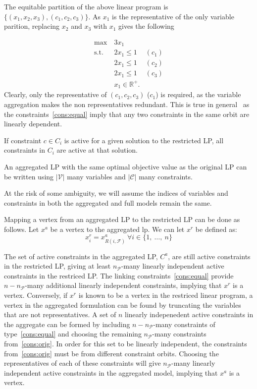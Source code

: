 \documentclass[runningheads]{llncs}
\newcommand{\cP}{{\mathcal P}}
\newcommand{\cF}{{\mathcal F}}
\newcommand{\cC}{{\mathcal C}}
\newcommand{\cV}{{\mathcal V}}
\begin{document}
\noindent The equitable partition of the above linear program is $\{(x_1, x_2, x_3), (c_1, c_2, c_3)\}$. As $x_1$ is the representative of the only variable parition, replacing $x_2$ and $x_3$ with $x_1$ gives the following 

\begin{align}
\max\ & 3x_1 \\
\mbox{s.t. } & 2x_1  \leq 1 & (c_1)\\
& 2x_1 \leq 1 & (c_2)\\
& 2x_1  \leq 1 & (c_3)\\
& x_1 \in \mathbb{R}^+.
\end{align}
\noindent Clearly, only the representative of $(c_1, c_2, c_3)$  ($c_1$) is required, as the variable aggregation makes the non representatives redundant. This is true in general~\cite{grohe} as the constraints~\eqref{cons:equal} imply that any two constraints in the same orbit are linearly dependent.


\begin{corollary} \label{cor:cons_equal}
	If constraint $c \in C_i$ is active for a given solution to the restricted LP, all constraints in $C_i$ are active at that solution.
\end{corollary}


\begin{corollary}
	An aggregated LP with the same optimal objective
	value as the original LP can be written using $|\cV|$ many variables and $|\cC|$ many constraints.
\end{corollary}



At the risk of some ambiguity, we will assume the indices of variables and constraints in both the aggregated and full models remain the same.


Mapping a vertex from an aggregated LP to the restricted LP can be done as follows. Let $x^a$ be a vertex to the aggregated lp. We can let $x^r$ be defined as:
$$x_i^r = x_{R(i,\cF)}^a \ \forall i \in \{1,\ \ldots,\ n\} $$

\noindent The set of active constraints in the aggregated LP, $C^a$, are still  active constraints in the restricted LP, giving at least $n_\cP$-many linearly independent active constraints in the restriced LP. The linking constraints~\eqref{cons:equal} provide $n-n_\cP$-many additional linearly independent constraints, implying that $x^r$ is a vertex. Conversely, if $x^r$ is known to be a vertex in the restriced linear program, a vertex in the aggregated formulation can be found by truncating the variables that are not representatives. A set of $n$ linearly indepenedent active constraints in the aggregate can be formed by including $n-n_\cP$-many constraints of type~\eqref{cons:equal} and choosing the remaining $n_\cP$-many constraints from~\eqref{cons:orig}. In order for this set to be linearly independent, the constraints from~\eqref{cons:orig} must be from different constraint orbits. Choosing the representatives of each of these constraints will give $n_\cP$-many linearly independent active constraints in the aggregated model, implying that $x^a$ is a vertex.
\end{document}
